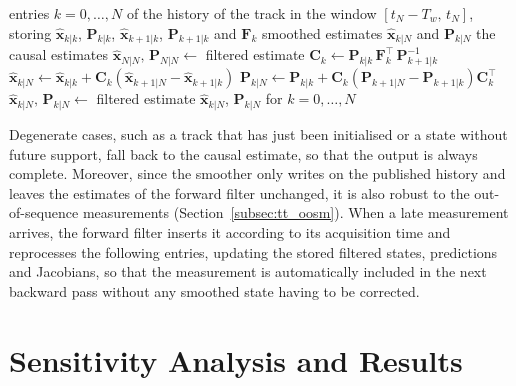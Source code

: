 \begin{algorithm}[H]
\caption{RTS smoother on the sliding window of the history, for a single track.}
\label{alg:rts}
\begin{algorithmic}[1]
\REQUIRE entries $k = 0, \dots, N$ of the history of the track in the window
$[t_N - T_w,\, t_N]$, storing $\hat{\mathbf{x}}_{k|k}$, $\mathbf{P}_{k|k}$,
$\hat{\mathbf{x}}_{k+1|k}$, $\mathbf{P}_{k+1|k}$ and $\mathbf{F}_k$
\ENSURE smoothed estimates $\hat{\mathbf{x}}_{k|N}$ and $\mathbf{P}_{k|N}$
    \RETURN the causal estimates
\ENDIF
\STATE $\hat{\mathbf{x}}_{N|N},\, \mathbf{P}_{N|N} \leftarrow$ filtered estimate 
        \STATE $\mathbf{C}_k \leftarrow \mathbf{P}_{k|k}\,\mathbf{F}_k^\top\,\mathbf{P}_{k+1|k}^{-1}$
        \STATE $\hat{\mathbf{x}}_{k|N} \leftarrow \hat{\mathbf{x}}_{k|k} + \mathbf{C}_k\left(\hat{\mathbf{x}}_{k+1|N} - \hat{\mathbf{x}}_{k+1|k}\right)$
        \STATE $\mathbf{P}_{k|N} \leftarrow \mathbf{P}_{k|k} + \mathbf{C}_k\left(\mathbf{P}_{k+1|N} - \mathbf{P}_{k+1|k}\right)\mathbf{C}_k^\top$
    \ELSE
        \STATE $\hat{\mathbf{x}}_{k|N},\, \mathbf{P}_{k|N} \leftarrow$ filtered estimate 
    \ENDIF
\ENDFOR
\RETURN $\hat{\mathbf{x}}_{k|N}$, $\mathbf{P}_{k|N}$ for $k = 0, \dots, N$
\end{algorithmic}
\end{algorithm}

Degenerate cases, such as a track that has just been initialised or a state without future
support, fall back to the causal estimate, so that the output is always complete. Moreover,
since the smoother only writes on the published history and leaves the estimates of the
forward filter unchanged, it is also robust to the out-of-sequence measurements
(Section~\ref{subsec:tt_oosm}). When a late measurement arrives, the forward filter inserts
it according to its acquisition time and reprocesses the following entries, updating the
stored filtered states, predictions and Jacobians, so that the measurement is automatically
included in the next backward pass without any smoothed state having to be corrected.

\section{Sensitivity Analysis and Results}
\label{sec:rts_sensitivity}

